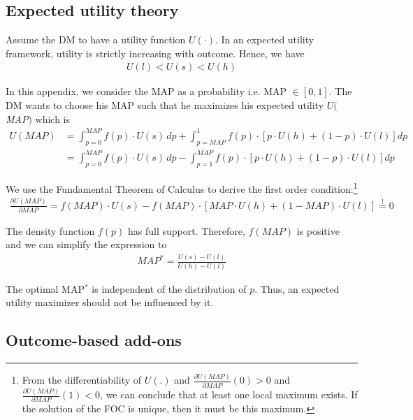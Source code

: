 \subsection{Expected utility theory}
\label{subsec:EUT}

Assume the DM to have a utility function $U(\cdot)$. 
In an expected utility framework, utility is strictly increasing with outcome.
Hence, we have 
\begin{align}
	U(l) < U(s) < U(h)
\end{align}

In this appendix, we consider the MAP as a probability i.e. MAP $\in [0,1]$. The DM wants to choose his MAP such that he maximizes his expected utility $U($\textit{MAP}$)$ which is
\begin{align}
	U(\textit{MAP}) &= \int_{p=0}^{\textit{MAP}} f(p) \cdot U(s) \, dp %
	+ \int_{p=\textit{MAP}}^1 f(p) \cdot \left[p \cdot U(h) + (1-p) \cdot U(l) \right] dp \\
	     &= \int_{p=0}^{\textit{MAP}} f(p) \cdot U(s) \, dp %
	     - \int_{p=1}^{\textit{MAP}} f(p) \cdot \left[p \cdot U(h) + (1-p) \cdot U(l) \right] dp 
\end{align}

We use the Fundamental Theorem of Calculus to derive the first order condition:\footnote{
From the differentiability of $U(.)$ and $\frac{\partial U(\textit{MAP})}{\partial \textit{MAP}} (0) > 0 $ and $\frac{\partial U(\textit{MAP})}{\partial \textit{MAP}} (1) < 0$, we can conclude that at least one local maximum exists.
If the solution of the FOC is unique, then it must be this maximum.
}
\begin{align}
	\frac{\partial U(\textit{MAP})}{\partial\textit{MAP}} %
	= f(\textit{MAP}) \cdot U(s) - f(\textit{MAP}) \cdot \left[\textit{MAP} \cdot U(h) + (1-\textit{MAP}) \cdot U(l) \right] \stackrel{!}{=} 0
\end{align}

The density function $f(p)$ has full support.
Therefore, $f(\textit{MAP})$ is positive and we can simplify the expression to 
\begin{align}
	\textit{MAP}^* = \frac{U(s)-U(l)}{U(h)-U(l)}
\end{align}

The optimal MAP$^*$ is independent of the distribution of $p$.
Thus, an expected utility maximizer should not be influenced by it. 


\subsection{Outcome-based add-ons}

